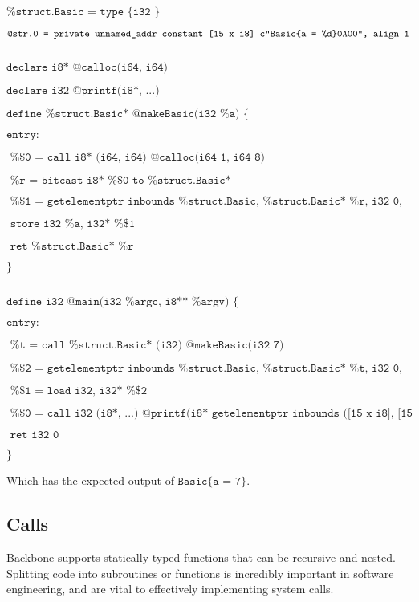 \documentclass[journal=jacsat, manuscript=article]{achemso}
\begin{document}
\footnotesize{
$\texttt{\%struct.Basic = type \{ i32 \}}$

$\texttt{@str.0 = private unnamed\_addr constant [15 x i8] c"Basic\{a = \%d\}\\0A\\00", align 1}$

$\texttt{}$

$\texttt{declare i8* @calloc(i64, i64)}$

$\texttt{declare i32 @printf(i8*, ...)}$

$\texttt{define \%struct.Basic* @makeBasic(i32 \%a) \{}$

$\texttt{entry:}$
  
$\texttt{  \%\$0 = call i8* (i64, i64) @calloc(i64 1, i64 8)}$
  
$\texttt{  \%r = bitcast i8* \%\$0 to \%struct.Basic*}$
  
$\texttt{  \%\$1 = getelementptr inbounds \%struct.Basic, \%struct.Basic* \%r, i32 0, i32 0}$
  
$\texttt{  store i32 \%a, i32* \%\$1}$
  
$\texttt{  ret \%struct.Basic* \%r}$

$\texttt{\}}$

$\texttt{}$

$\texttt{define i32 @main(i32 \%argc, i8** \%argv) \{}$

$\texttt{entry:}$
  
$\texttt{  \%t = call \%struct.Basic* (i32) @makeBasic(i32 7)}$
  
$\texttt{  \%\$2 = getelementptr inbounds \%struct.Basic, \%struct.Basic* \%t, i32 0, i32 0}$
  
$\texttt{  \%\$1 = load i32, i32* \%\$2}$
  
$\texttt{  \%\$0 = call i32 (i8*, ...) @printf(i8* getelementptr inbounds ([15 x i8], [15 x i8]* @str.0, i64 0, i64 0),
i32 \%\$1)}$

$\texttt{  ret i32 0}$

$\texttt{\}}$
}

\normalsize

Which has the expected output of $\texttt{Basic\{a = 7\}}$.

\subsection{Calls}

Backbone supports statically typed functions that can be recursive and nested. Splitting code into
subroutines or functions is incredibly important in software engineering, and are vital to effectively
implementing system calls.
\end{document}
